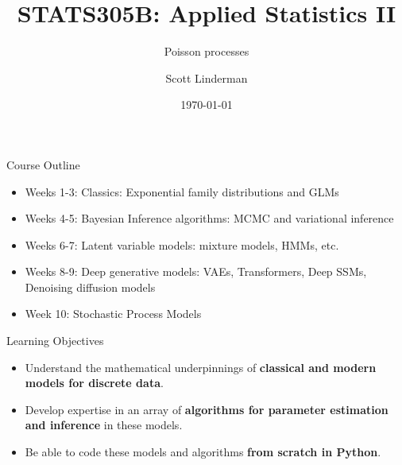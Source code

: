 \documentclass[aspectratio=169]{beamer}
\title{STATS305B: Applied Statistics II}
\subtitle{Poisson processes}
\author{Scott Linderman}
\date{\today}
\begin{document}
\maketitle


\begin{frame}{Course Outline}

\begin{itemize}
    \item Weeks 1-3: Classics: Exponential family distributions and GLMs
    \item Weeks 4-5: Bayesian Inference algorithms: MCMC and variational inference
    \item Weeks 6-7: Latent variable models: mixture models, HMMs, etc.
    \item Weeks 8-9: Deep generative models: VAEs, Transformers, Deep SSMs, Denoising diffusion models
    \item Week 10: Stochastic Process Models
\end{itemize}

\end{frame}


\begin{frame}{Learning Objectives}
    \begin{itemize}
    \item Understand the mathematical underpinnings of \textbf{classical and modern models for discrete data}.
    
    \item Develop expertise in an array of \textbf{algorithms for parameter estimation and inference} in these models.
    
    \item Be able to code these models and algorithms \textbf{from scratch in Python}.
    \end{itemize}
\end{frame}
\end{document}
